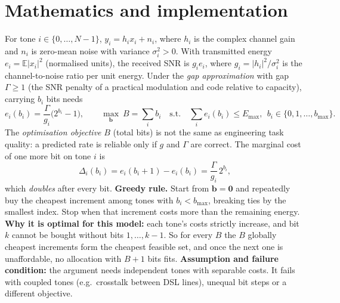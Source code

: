 \documentclass[10pt,a4paper]{article}
\begin{document}
\section{Mathematics and implementation}
For tone $i\in\{0,\dots,N-1\}$, $y_i=h_ix_i+n_i$, where $h_i$ is the complex channel gain and $n_i$ is zero-mean noise with variance
$\sigma_i^2>0$. With transmitted energy $e_i=\mathbb{E}|x_i|^2$ (normalised units), the received SNR is $g_ie_i$, where
$g_i=|h_i|^2/\sigma_i^2$ is the channel-to-noise ratio per unit energy. Under the \emph{gap approximation} with gap $\Gamma\ge1$
(the SNR penalty of a practical modulation and code relative to capacity), carrying $b_i$ bits needs
\begin{equation}
e_i(b_i)=\frac{\Gamma}{g_i}\bigl(2^{b_i}-1\bigr),\qquad
\max_{\mathbf b}\ B=\sum_i b_i\quad\text{s.t.}\quad \sum_i e_i(b_i)\le E_{\max},\ \ b_i\in\{0,1,\dots,b_{\max}\}.
\label{eq:problem}
\end{equation}
The \emph{optimisation objective} $B$ (total bits) is not the same as engineering task quality: a predicted rate is reliable only if
$g$ and $\Gamma$ are correct. The marginal cost of one more bit on tone $i$ is
\begin{equation}
\Delta_i(b_i)=e_i(b_i{+}1)-e_i(b_i)=\frac{\Gamma}{g_i}\,2^{b_i},
\label{eq:delta}
\end{equation}
which \emph{doubles} after every bit. \textbf{Greedy rule.} Start from $\mathbf b=\mathbf 0$ and repeatedly buy the cheapest
increment among tones with $b_i<b_{\max}$, breaking ties by the smallest index. Stop when that increment costs more than the
remaining energy. \textbf{Why it is optimal for this model:} each tone's costs strictly increase, and bit $k$ cannot be bought
without bits $1,\dots,k{-}1$. So for every $B$ the $B$ globally cheapest increments form the cheapest feasible set, and once the
next one is unaffordable, no allocation with $B{+}1$ bits fits. \textbf{Assumption and failure condition:} the argument needs
independent tones with separable costs. It fails with coupled tones (e.g.\ crosstalk between DSL lines), unequal bit steps
or a different objective.
\end{document}

